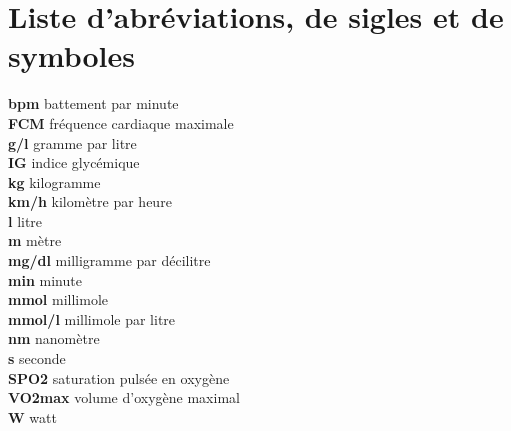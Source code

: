 \chapter*{Liste d’abréviations, de sigles et de symboles}
\label{chap:abreviation}

\textbf{bpm} battement par minute \\

\textbf{FCM} fréquence cardiaque maximale\\

\textbf{g/l} gramme par litre \\

\textbf{IG} indice glycémique \\

\textbf{kg} kilogramme \\

\textbf{km/h} kilomètre par heure\\

\textbf{l} litre \\

\textbf{m} mètre \\

\textbf{mg/dl} milligramme par décilitre \\

\textbf{min} minute \\

\textbf{mmol} millimole \\

\textbf{mmol/l} millimole par litre\\

\textbf{nm} nanomètre\\

\textbf{s} seconde \\

\textbf{SPO2} saturation pulsée en oxygène\\

\textbf{VO2max} volume d'oxygène maximal \\

\textbf{W} watt \\       
